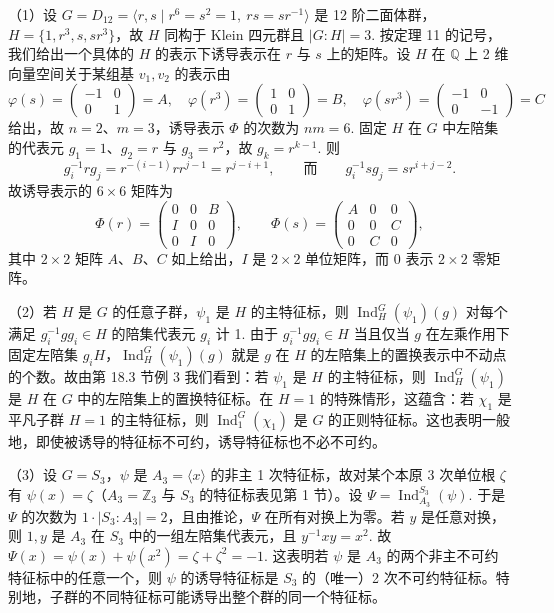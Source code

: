 （1）设 \(G = D_{12} = \langle r, s \mid r^6 = s^2 = 1,\ rs = sr^{-1}\rangle\) 是 12 阶二面体群，\(H = \{1, r^3, s, sr^3\}\)，故 \(H\) 同构于 Klein 四元群且 \(|G : H| = 3\). 按定理 11 的记号，我们给出一个具体的 \(H\) 的表示下诱导表示在 \(r\) 与 \(s\) 上的矩阵。设 \(H\) 在 \(\mathbb{Q}\) 上 2 维向量空间关于某组基 \(v_1, v_2\) 的表示由
\[
\varphi(s) = \begin{pmatrix}-1 & 0\\ 0 & 1\end{pmatrix} = A, \quad \varphi(r^3) = \begin{pmatrix}1 & 0\\ 0 & 1\end{pmatrix} = B, \quad \varphi(sr^3) = \begin{pmatrix}-1 & 0\\ 0 & -1\end{pmatrix} = C
\]
给出，故 \(n = 2\)、\(m = 3\)，诱导表示 \(\Phi\) 的次数为 \(nm = 6\). 固定 \(H\) 在 \(G\) 中左陪集的代表元 \(g_1 = 1\)、\(g_2 = r\) 与 \(g_3 = r^2\)，故 \(g_k = r^{k-1}\). 则
\[
g_i^{-1}rg_j = r^{-(i-1)}rr^{j-1} = r^{j-i+1}, \qquad \text{而} \qquad g_i^{-1}sg_j = sr^{i+j-2}.
\]
故诱导表示的 \(6 \times 6\) 矩阵为
\[
\Phi(r) = \begin{pmatrix}0 & 0 & B\\ I & 0 & 0\\ 0 & I & 0\end{pmatrix}, \qquad \Phi(s) = \begin{pmatrix}A & 0 & 0\\ 0 & 0 & C\\ 0 & C & 0\end{pmatrix},
\]
其中 \(2 \times 2\) 矩阵 \(A\)、\(B\)、\(C\) 如上给出，\(I\) 是 \(2 \times 2\) 单位矩阵，而 \(0\) 表示 \(2 \times 2\) 零矩阵。

（2）若 \(H\) 是 \(G\) 的任意子群，\(\psi_1\) 是 \(H\) 的主特征标，则 \(\operatorname{Ind}_H^G(\psi_1)(g)\) 对每个满足 \(g_i^{-1}gg_i \in H\) 的陪集代表元 \(g_i\) 计 1. 由于 \(g_i^{-1}gg_i \in H\) 当且仅当 \(g\) 在左乘作用下固定左陪集 \(g_iH\)，\(\operatorname{Ind}_H^G(\psi_1)(g)\) 就是 \(g\) 在 \(H\) 的左陪集上的置换表示中不动点的个数。故由第 18.3 节例 3 我们看到：若 \(\psi_1\) 是 \(H\) 的主特征标，则 \(\operatorname{Ind}_H^G(\psi_1)\) 是 \(H\) 在 \(G\) 中的左陪集上的置换特征标。在 \(H = 1\) 的特殊情形，这蕴含：若 \(\chi_1\) 是平凡子群 \(H = 1\) 的主特征标，则 \(\operatorname{Ind}_1^G(\chi_1)\) 是 \(G\) 的正则特征标。这也表明一般地，即使被诱导的特征标不可约，诱导特征标也不必不可约。

（3）设 \(G = S_3\)，\(\psi\) 是 \(A_3 = \langle x\rangle\) 的非主 1 次特征标，故对某个本原 3 次单位根 \(\zeta\) 有 \(\psi(x) = \zeta\)（\(A_3 = \mathbb{Z}_3\) 与 \(S_3\) 的特征标表见第 1 节）。设 \(\Psi = \operatorname{Ind}_{A_3}^{S_3}(\psi)\). 于是 \(\Psi\) 的次数为 \(1 \cdot |S_3 : A_3| = 2\)，且由推论，\(\Psi\) 在所有对换上为零。若 \(y\) 是任意对换，则 \(1, y\) 是 \(A_3\) 在 \(S_3\) 中的一组左陪集代表元，且 \(y^{-1}xy = x^2\). 故 \(\Psi(x) = \psi(x)+\psi(x^2) = \zeta+\zeta^2 = -1\). 这表明若 \(\psi\) 是 \(A_3\) 的两个非主不可约特征标中的任意一个，则 \(\psi\) 的诱导特征标是 \(S_3\) 的（唯一）2 次不可约特征标。特别地，子群的不同特征标可能诱导出整个群的同一个特征标。

